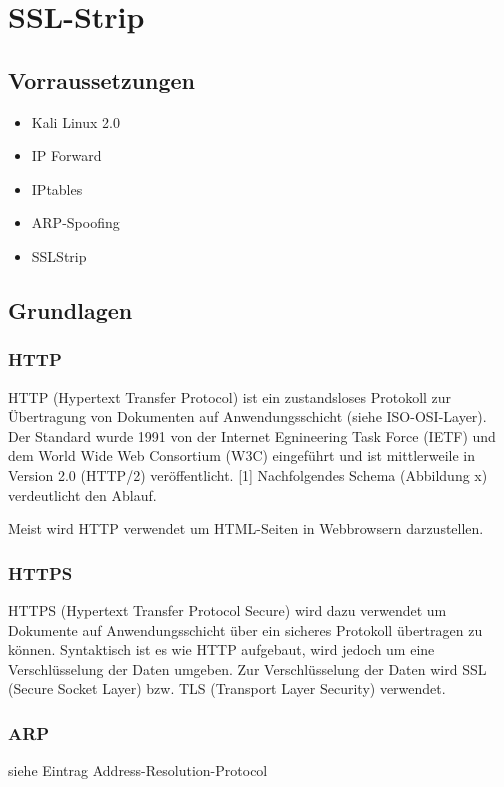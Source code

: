 \section{SSL-Strip}

\subsection*{Vorraussetzungen}

\begin{itemize}
\item Kali Linux 2.0
\item IP Forward
\item IPtables
\item ARP-Spoofing
\item SSLStrip
\end{itemize}


\subsection*{Grundlagen}

\subsubsection*{HTTP}
HTTP (Hypertext Transfer Protocol) ist ein zustandsloses Protokoll zur Übertragung von Dokumenten auf Anwendungsschicht (siehe ISO-OSI-Layer). Der Standard wurde 1991 von der Internet Egnineering
Task Force (IETF) und dem World Wide Web Consortium (W3C) eingeführt und ist mittlerweile in Version 2.0 (HTTP/2) veröffentlicht. [1]
Nachfolgendes Schema (Abbildung x) verdeutlicht den Ablauf.

Meist wird HTTP verwendet um HTML-Seiten in Webbrowsern darzustellen.

\subsubsection*{HTTPS}
HTTPS (Hypertext Transfer Protocol Secure) wird dazu verwendet um Dokumente auf Anwendungsschicht über ein sicheres Protokoll übertragen zu können. Syntaktisch ist es wie HTTP aufgebaut,
 wird jedoch um eine Verschlüsselung der Daten umgeben. Zur Verschlüsselung der Daten wird SSL (Secure Socket Layer) bzw. TLS (Transport Layer Security) verwendet.

\subsubsection*{ARP}
siehe Eintrag Address-Resolution-Protocol

